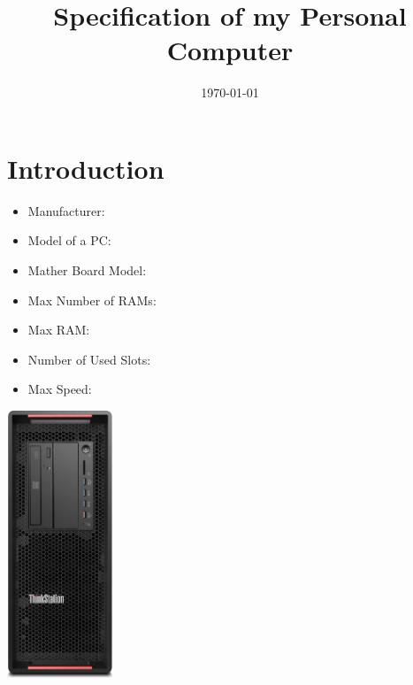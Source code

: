 \documentclass{article}
\title{Specification of my Personal Computer}
\author{}
\date{\today}
\begin{document}
\maketitle

\section{Introduction}
\begin{itemize}
  \item Manufacturer:
  \item Model of a PC:
  \item Mather Board Model:
  \item Max Number of RAMs:
  \item Max RAM:
  \item Number of Used Slots:
  \item Max Speed:
\end{itemize}
\href{https://www.getech.co.uk/pdf/p5001.pdf}{\includegraphics[height=8cm]{PC.jpg}}
\end{document}

